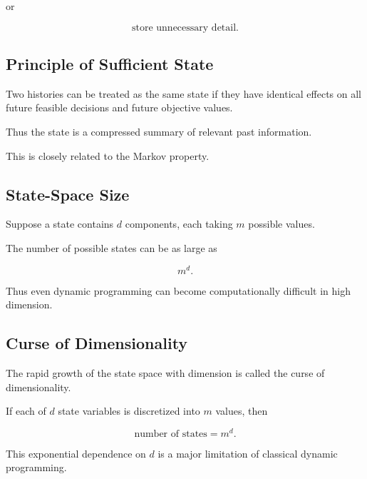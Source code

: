 or

\[
\boxed{
\text{store unnecessary detail}.
}
\]

\subsection{Principle of Sufficient State}
\label{subsec:sufficient-state}

Two histories can be treated as the same state if they have identical
effects on all future feasible decisions and future objective values.

Thus the state is a compressed summary of relevant past information.

This is closely related to the Markov property.

\subsection{State-Space Size}
\label{subsec:dynamic-programming-state-space-size}

Suppose a state contains \(d\) components, each taking \(m\) possible
values.

The number of possible states can be as large as

\[
\boxed{
m^d.
}
\]

Thus even dynamic programming can become computationally difficult in high
dimension.

\subsection{Curse of Dimensionality}
\label{subsec:curse-of-dimensionality}

The rapid growth of the state space with dimension is called the curse of
dimensionality.

If each of \(d\) state variables is discretized into \(m\) values, then

\[
\boxed{
\text{number of states}
=
m^d.
}
\]

This exponential dependence on \(d\) is a major limitation of classical
dynamic programming.

